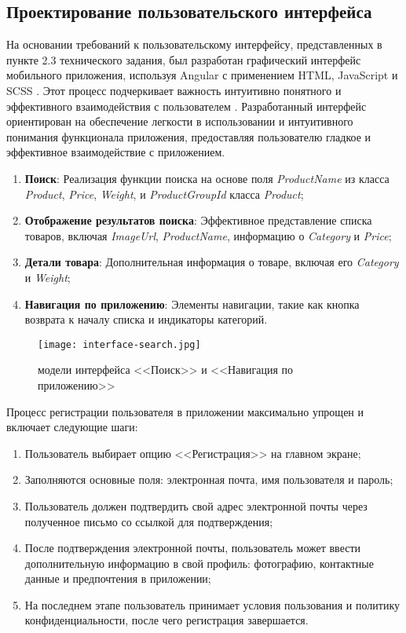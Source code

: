 \subsection{Проектирование пользовательского интерфейса}

На основании требований к пользовательскому интерфейсу, представленных в пункте 2.3 технического задания, был разработан графический интерфейс мобильного приложения, используя Angular с применением HTML, JavaScript и SCSS \cite{cssspecs}. Этот процесс подчеркивает важность интуитивно понятного и эффективного взаимодействия с пользователем \cite{kumskova}.
Разработанный интерфейс ориентирован на обеспечение легкости в использовании и интуитивного понимания функционала приложения, предоставляя пользователю гладкое и эффективное взаимодействие с приложением.

\begin{enumerate}
    \item \textbf{Поиск}: Реализация функции поиска на основе поля \textit{ProductName} из класса \textit{Product}, \textit{Price}, \textit{Weight}, и \textit{ProductGroupId} класса \textit{Product};
    \item \textbf{Отображение результатов поиска}: Эффективное представление списка товаров, включая \textit{ImageUrl}, \textit{ProductName}, информацию о \textit{Category} и \textit{Price};
    \item \textbf{Детали товара}: Дополнительная информация о товаре, включая его \textit{Category} и \textit{Weight};
    \item \textbf{Навигация по приложению}: Элементы навигации, такие как кнопка возврата к началу списка и индикаторы категорий.
\end{enumerate}

\begin{figure}[h!]
    \texttt{[image: interface-search.jpg]}
    \caption{модели интерфейса <<Поиск>> и <<Навигация по приложению>>}
    \label{fig:search}
\end{figure}

Процесс регистрации пользователя в приложении максимально упрощен и включает следующие шаги:
\begin{enumerate}
    \item Пользователь выбирает опцию <<Регистрация>> на главном экране;
    \item Заполняются основные поля: электронная почта, имя пользователя и пароль;
    \item Пользователь должен подтвердить свой адрес электронной почты через полученное письмо со ссылкой для подтверждения;
    \item После подтверждения электронной почты, пользователь может ввести дополнительную информацию в свой профиль: фотографию, контактные данные и предпочтения в приложении;
    \item На последнем этапе пользователь принимает условия пользования и политику конфиденциальности, после чего регистрация завершается.
\end{enumerate}

